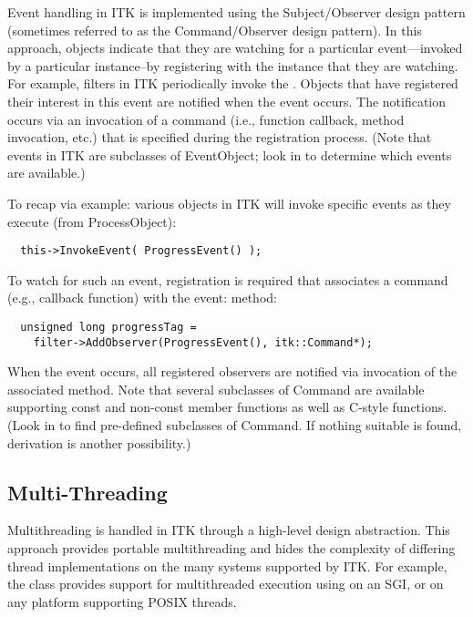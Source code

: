 
Event handling in ITK is implemented using the Subject/Observer design
pattern \cite{Gamma1995} (sometimes referred to as the Command/Observer
design pattern). In this approach, objects indicate that they are watching
for a particular event---invoked by a particular instance--by registering
with the instance that they are watching.  For example, filters in ITK
periodically invoke the . Objects that have registered
their interest in this event are notified when the event occurs. The
notification occurs via an invocation of a command (i.e., function callback,
method invocation, etc.) that is specified during the registration
process. (Note that events in ITK are subclasses of EventObject; look
in  to determine which events are available.)

To recap via example: various objects in ITK will invoke specific events
as they execute (from ProcessObject):
\small
\begin{verbatim}
  this->InvokeEvent( ProgressEvent() );
\end{verbatim}
\normalsize

To watch for such an event, registration is required that associates a
command (e.g., callback function) with the event:
 method:
\small
\begin{verbatim}
  unsigned long progressTag = 
    filter->AddObserver(ProgressEvent(), itk::Command*);
\end{verbatim}
\normalsize

When the event occurs, all registered observers are notified via invocation
of the associated  method. Note that several
subclasses of Command are available supporting const and
non-const member functions as well as C-style functions. (Look in
 to find pre-defined subclasses of
Command. If nothing suitable is found, derivation is another
possibility.)

\subsection{Multi-Threading}
\label{sec:MultiThreading}

Multithreading is handled in ITK through a high-level design
abstraction. This approach provides portable multithreading and hides the
complexity of differing thread implementations on the many systems supported
by ITK. For example, the class  provides support for
multithreaded execution using  on an SGI, or
 on any platform supporting POSIX threads. 

